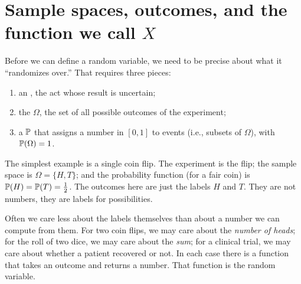 \section{Sample spaces, outcomes, and the function we call \texorpdfstring{$X$}{X}}
\label{sec:rvs-samplespace}

Before we can define a random variable, we need to be precise about what it ``randomizes over.'' That requires three pieces:

\begin{enumerate}
\item an , the act whose result is uncertain;
\item the  $\Omega$, the set of all possible outcomes of the experiment;
\item a  $\mathbb{P}$ that assigns a number in $[0,1]$ to events (i.e., subsets of $\Omega$), with $\mathbb{P}(\Omega) = 1$.
\end{enumerate}


\marginGap


The simplest example is a single coin flip. The experiment is the flip; the sample space is $\Omega = \{H, T\}$; and the probability function (for a fair coin) is $\mathbb{P}(H) = \mathbb{P}(T) = \tfrac{1}{2}$. The outcomes here are just the labels $H$ and $T$. They are not numbers, they are labels for possibilities.

Often we care less about the labels themselves than about a number we can compute from them. For two coin flips, we may care about the \emph{number of heads}; for the roll of two dice, we may care about the \emph{sum}; for a clinical trial, we may care about whether a patient recovered or not. In each case there is a function that takes an outcome and returns a number. That function is the random variable.

